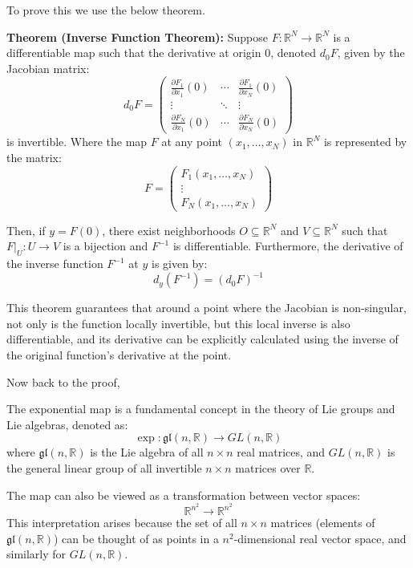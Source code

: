 \documentclass{article}
\begin{document}
To prove this we use the below theorem. 
\begin{theorem}
    \textbf{Theorem (Inverse Function Theorem):}
Suppose \( F: \mathbb{R}^N \rightarrow \mathbb{R}^N \) is a differentiable map such that the derivative at origin \( 0 \), denoted \( d_0 F \), given by the Jacobian matrix:
\[
d_0 F = \begin{pmatrix}
\frac{\partial F_1}{\partial x_1}(0) & \cdots & \frac{\partial F_1}{\partial x_N}(0) \\
\vdots & \ddots & \vdots \\
\frac{\partial F_N}{\partial x_1}(0) & \cdots & \frac{\partial F_N}{\partial x_N}(0)
\end{pmatrix}
\]
is invertible. 
Where the map \( F \) at any point \((x_1, \ldots, x_N)\) in \(\mathbb{R}^N\) is represented by the matrix:
    \[
    F = \begin{pmatrix}
    F_1(x_1, \ldots, x_N) \\
    \vdots \\
    F_N(x_1, \ldots, x_N)
    \end{pmatrix}
    \]

Then, if \( y = F(0) \), there exist neighborhoods \( O \subseteq \mathbb{R}^N \) and \( V \subseteq \mathbb{R}^N \) such that \( F|_U: U \rightarrow V \) is a bijection and \( F^{-1} \) is differentiable. Furthermore, the derivative of the inverse function \( F^{-1} \) at \( y \) is given by:
\[
d_y (F^{-1}) = (d_0 F)^{-1}
\]
  
\end{theorem}

This theorem guarantees that around a point where the Jacobian is non-singular, not only is the function locally invertible, but this local inverse is also differentiable, and its derivative can be explicitly calculated using the inverse of the original function's derivative at the point.

Now back to the proof, 

The exponential map is a fundamental concept in the theory of Lie groups and Lie algebras, denoted as:
\[
\exp: \mathfrak{gl}(n, \mathbb{R}) \rightarrow GL(n, \mathbb{R})
\]
where \(\mathfrak{gl}(n, \mathbb{R})\) is the Lie algebra of all \(n \times n\) real matrices, and \(GL(n, \mathbb{R})\) is the general linear group of all invertible \(n \times n\) matrices over \(\mathbb{R}\).

The map can also be viewed as a transformation between vector spaces:
\[
\mathbb{R}^{n^2} \rightarrow \mathbb{R}^{n^2}
\]
This interpretation arises because the set of all \(n \times n\) matrices (elements of \(\mathfrak{gl}(n, \mathbb{R})\)) can be thought of as points in a \(n^2\)-dimensional real vector space, and similarly for \(GL(n, \mathbb{R})\).
\end{document}
